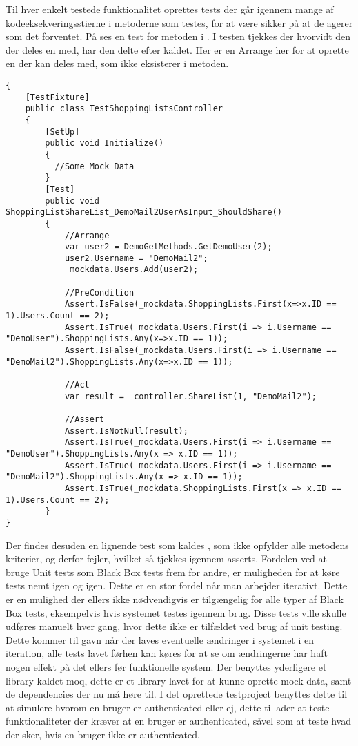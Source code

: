 Til hver enkelt testede funktionalitet oprettes tests der går igennem mange af kodeeksekveringsstierne i metoderne som testes, for at være sikker på at de agerer som det forventet.
På  ses en test for metoden  i . 
I testen tjekkes der hvorvidt den  der deles en  med, har den delte  efter kaldet.
Her er en Arrange her for at oprette en  der kan deles med, som ikke eksisterer i  metoden.

\begin{lstlisting}[caption={Test for metoden \class{ShareList}.}, label=lsttest]
{
    [TestFixture]
    public class TestShoppingListsController
    {
    	[SetUp]
        public void Initialize()
        {
          //Some Mock Data
        }
        [Test]
        public void ShoppingListShareList_DemoMail2UserAsInput_ShouldShare()
        {
            //Arrange
            var user2 = DemoGetMethods.GetDemoUser(2);
            user2.Username = "DemoMail2";
            _mockdata.Users.Add(user2); 

            //PreCondition
            Assert.IsFalse(_mockdata.ShoppingLists.First(x=>x.ID == 1).Users.Count == 2);
            Assert.IsTrue(_mockdata.Users.First(i => i.Username == "DemoUser").ShoppingLists.Any(x=>x.ID == 1));
            Assert.IsFalse(_mockdata.Users.First(i => i.Username == "DemoMail2").ShoppingLists.Any(x=>x.ID == 1));

            //Act
            var result = _controller.ShareList(1, "DemoMail2");

            //Assert
            Assert.IsNotNull(result);
            Assert.IsTrue(_mockdata.Users.First(i => i.Username == "DemoUser").ShoppingLists.Any(x => x.ID == 1));
            Assert.IsTrue(_mockdata.Users.First(i => i.Username == "DemoMail2").ShoppingLists.Any(x => x.ID == 1));
            Assert.IsTrue(_mockdata.ShoppingLists.First(x => x.ID == 1).Users.Count == 2);
        }
}        
\end{lstlisting}
Der findes desuden en lignende test som kaldes , som ikke opfylder alle metodens kriterier, og derfor fejler, hvilket så tjekkes igennem asserts.
Fordelen ved at bruge Unit tests som Black Box tests frem for andre, er muligheden for at køre tests nemt igen og igen.
Dette er en stor fordel når man arbejder iterativt.
Dette er en mulighed der ellers ikke nødvendigvis er tilgængelig for alle typer af Black Box tests, eksempelvis hvis systemet testes igennem brug.
Disse tests ville skulle udføres manuelt hver gang, hvor dette ikke er tilfældet ved brug af unit testing.
Dette kommer til gavn når der laves eventuelle ændringer i systemet i en iteration, alle tests lavet førhen kan køres for at se om ændringerne har haft nogen effekt på det ellers før funktionelle system. 
Der benyttes yderligere et library kaldet moq, dette er et library lavet for at kunne oprette mock data, samt de dependencies der nu må høre til.
I det oprettede testproject benyttes dette til at simulere hvorom en bruger er authenticated eller ej, dette tillader at teste funktionaliteter der kræver at en bruger er authenticated, såvel som at teste hvad der sker, hvis en bruger ikke er authenticated.

